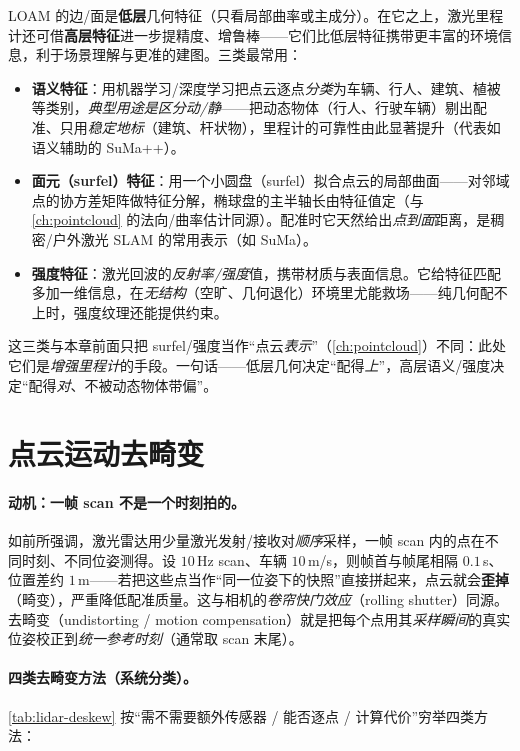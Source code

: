 LOAM 的边/面是\textbf{低层}几何特征（只看局部曲率或主成分）。在它之上，激光里程计还可借\textbf{高层特征}进一步提精度、增鲁棒——它们比低层特征携带更丰富的环境信息，利于场景理解与更准的建图\cite{carlone2026handbook}。三类最常用：
\begin{itemize}
  \item \textbf{语义特征}：用机器学习/深度学习把点云逐点\emph{分类}为车辆、行人、建筑、植被等类别，\emph{典型用途是区分动/静}——把动态物体（行人、行驶车辆）剔出配准、只用\emph{稳定地标}（建筑、杆状物），里程计的可靠性由此显著提升（代表如语义辅助的 SuMa++\cite{chen2019suma++}）。
  \item \textbf{面元（surfel）特征}：用一个小圆盘（surfel）拟合点云的局部曲面——对邻域点的协方差矩阵做特征分解，椭球盘的主半轴长由特征值定（与 \cref{ch:pointcloud} 的法向/曲率估计同源）。配准时它天然给出\emph{点到面}距离，是稠密/户外激光 SLAM 的常用表示（如 SuMa\cite{behley2018efficient}）。
  \item \textbf{强度特征}：激光回波的\emph{反射率/强度}值，携带材质与表面信息。它给特征匹配多加一维信息，在\emph{无结构}（空旷、几何退化）环境里尤能救场——纯几何配不上时，强度纹理还能提供约束\cite{carlone2026handbook}。
\end{itemize}
这三类与本章前面只把 surfel/强度当作“点云\emph{表示}”（\cref{ch:pointcloud}）不同：此处它们是\emph{增强里程计}的手段。一句话——低层几何决定“配得\emph{上}”，高层语义/强度决定“配得\emph{对}、不被动态物体带偏”。

\section{点云运动去畸变}
\label{sec:lidar-deskew}

\paragraph{动机：一帧 scan 不是一个时刻拍的。}
如前所强调，激光雷达用少量激光发射/接收对\emph{顺序}采样，一帧 scan 内的点在不同时刻、不同位姿测得。设 $10$\,Hz scan、车辆 $10$\,m/s，则帧首与帧尾相隔 $0.1$\,s、位置差约 $1$\,m——若把这些点当作“同一位姿下的快照”直接拼起来，点云就会\textbf{歪掉}（畸变），严重降低配准质量\cite{carlone2026handbook}。这与相机的\emph{卷帘快门效应}（rolling shutter）同源。去畸变（undistorting / motion compensation）就是把每个点用其\emph{采样瞬间}的真实位姿校正到\emph{统一参考时刻}（通常取 scan 末尾）。

\paragraph{四类去畸变方法（系统分类）。}
\cref{tab:lidar-deskew} 按“需不需要额外传感器 / 能否逐点 / 计算代价”穷举四类方法\cite{carlone2026handbook}：

